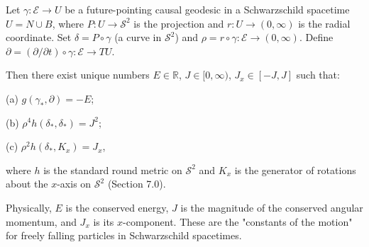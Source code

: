 Let $\gamma: \mathcal{E} \to U$ be a future-pointing causal geodesic in a Schwarzschild spacetime $U = N \cup B$, where $P: U \to \mathcal{S}^2$ is the projection and $r: U \to (0,\infty)$ is the radial coordinate. Set $\delta = P \circ \gamma$ (a curve in $\mathcal{S}^2$) and $\rho = r \circ \gamma: \mathcal{E} \to (0,\infty)$. Define $\partial = (\partial/\partial t) \circ \gamma: \mathcal{E} \to TU$.

Then there exist unique numbers $E \in \mathbb{R}$, $J \in [0, \infty)$, $J_x \in [-J, J]$ such that:

(a) $g(\gamma_*, \partial) = -E$;

(b) $\rho^4 h(\delta_*, \delta_*) = J^2$;

(c) $\rho^2 h(\delta_*, K_x) = J_x$,

where $h$ is the standard round metric on $\mathcal{S}^2$ and $K_x$ is the generator of rotations about the $x$-axis on $\mathcal{S}^2$ (Section 7.0).

Physically, $E$ is the conserved energy, $J$ is the magnitude of the conserved angular momentum, and $J_x$ is its $x$-component. These are the "constants of the motion" for freely falling particles in Schwarzschild spacetimes.

